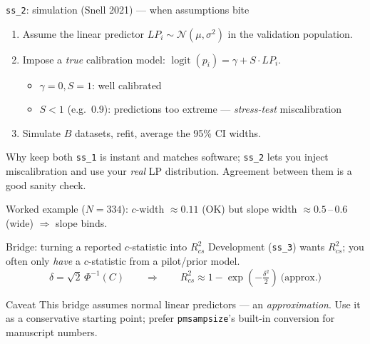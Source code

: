 \documentclass[10pt,aspectratio=169]{beamer}
\begin{document}
\begin{frame}{\texttt{ss\_2}: simulation (Snell 2021) --- when assumptions bite}
  \begin{enumerate}
    \item Assume the linear predictor $LP_i \sim \mathcal{N}(\mu,\sigma^2)$ in the validation population.
    \item Impose a \emph{true} calibration model: $\operatorname{logit}(p_i)=\gamma + S\cdot LP_i$.
      \begin{itemize}\footnotesize
        \item $\gamma=0, S=1$: well calibrated \quad
        \item $S<1$ (e.g.\ 0.9): predictions too extreme --- \emph{stress-test} miscalibration
      \end{itemize}
    \item Simulate $B$ datasets, refit, average the 95\% CI widths.
  \end{enumerate}
  \vfill
  \begin{exampleblock}{Why keep both}
    \texttt{ss\_1} is instant and matches software; \texttt{ss\_2} lets you inject miscalibration and use your
    \emph{real} LP distribution. Agreement between them is a good sanity check.
  \end{exampleblock}
  \vfill
  {\scriptsize Worked example ($N=334$): $c$-width $\approx 0.11$ \textcolor{devcol}{(OK)} but slope width $\approx 0.5$\,--\,0.6 \alert{(wide)} $\Rightarrow$ slope binds.}
\end{frame}

\begin{frame}{Bridge: turning a reported $c$-statistic into $R^2_{cs}$}
  Development (\texttt{ss\_3}) wants $R^2_{cs}$; you often only \emph{have} a $c$-statistic from a pilot/prior model.
  \vfill
  \[
    \delta=\sqrt{2}\,\Phi^{-1}(C)\qquad\Longrightarrow\qquad
    R^2_{cs}\approx 1-\exp\!\left(-\tfrac{\delta^2}{2}\right)\ \text{(approx.)}
  \]
  \vfill
  \begin{alertblock}{Caveat}
    This bridge assumes normal linear predictors --- an \emph{approximation}. Use it as a conservative
    starting point; prefer \texttt{pmsampsize}'s built-in conversion for manuscript numbers.
  \end{alertblock}
\end{frame}

\end{document}
